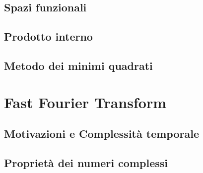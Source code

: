 \subsection{Spazi funzionali}
\subsection{Prodotto interno}
\subsection{Metodo dei minimi quadrati}


\section{Fast Fourier Transform}
\subsection{Motivazioni e Complessit\`a temporale}
\subsection{Propriet\`a dei numeri complessi}


